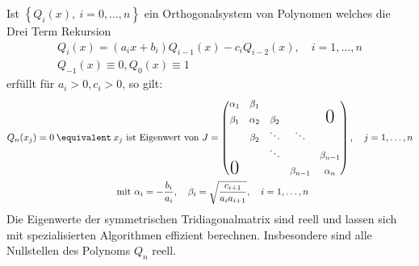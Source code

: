 \begin{maththeorem}
\label{golubwelschalg}
Ist $\left\lbrace Q_i(x),\: i=0,\dots,n\right\rbrace$ ein Orthogonalsystem von Polynomen welches die Drei Term Rekursion
\begin{eqnarray}
\label{threetermgolub}
Q_i(x)=(a_ix+b_i)Q_{i-1}(x)-c_iQ_{i-2}(x),\quad i=1,\dots , n\\
Q_{-1}(x)\equiv 0, Q_0(x)\equiv 1\nonumber
\end{eqnarray}
erfüllt für $a_i>0,c_i>0$, so gilt:
\begin{align*}
Q_n(x_j)=0\: \equivalent \: &x_j\text{ ist Eigenwert von }J=\begin{pmatrix}
\alpha_1 & \beta_1 &  &  &  \\ 
\beta_1 & \alpha_2 & \beta_2 & & \text{\huge0} \\ 
 & \beta_2 & \ddots & \ddots &  \\ 
 &  & \ddots & & \beta_{n-1} \\
\text{\huge0} &  &  & \beta_{n-1} & \alpha_n
\end{pmatrix},\quad j=1,\dots,n\\
&\text{ mit } \alpha_i=-\frac{b_i}{a_i},\quad \beta_i=\sqrt{\frac{c_{i+1}}{a_ia_{i+1}}},\quad i=1,\dots,n
\end{align*}
Die Eigenwerte der symmetrischen Tridiagonalmatrix sind reell und lassen sich mit spezialisierten Algorithmen effizient berechnen. Insbesondere sind alle Nullstellen des Polynoms $Q_n$ reell.
\end{maththeorem}
